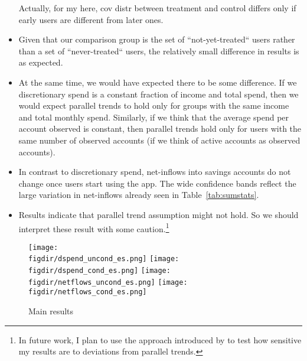 \begin{itemize}
        Actually, for my here, cov distr between treatment and control differs
        only if early users are different from later ones.

    \item  Given that our comparison group is the set of
        ``not-yet-treated`` users rather than a set of ``never-treated`` users,
        the relatively small difference in results is as expected.

    \item At the same time, we would have expected there to be some difference.
        If we discretionary spend is a constant fraction of income and total
        spend, then we would expect parallel trends to hold only for groups
        with the same income and total monthly spend. Similarly, if we think
        that the average spend per account observed is constant, then parallel
        trends hold only for users with the same number of observed accounts
        (if we think of active accounts as observed accounts).

    \item In contrast to discretionary spend, net-inflows into savings accounts
        do not change once users start using the app. The wide confidence
        bands reflect the large variation in net-inflows already seen in
        Table~\ref{tab:sumstats}.

    \item Results indicate that parallel trend assumption might not hold. So we
        should interpret these result with some
        caution.\footnote{In future work, I plan to use the approach introduced
            by \citet{rambachan2022more} to test how sensitive my results are
        to deviations from parallel trends.}


\end{itemize}


\begin{figure}[H]
    \centering 
    \caption{Main results}
    \label{fig:main_results}
    \texttt{[image: \\figdir/dspend\_uncond\_es.png]}
    \texttt{[image: \\figdir/dspend\_cond\_es.png]}
    \texttt{[image: \\figdir/netflows\_uncond\_es.png]}
    \texttt{[image: \\figdir/netflows\_cond\_es.png]}
\end{figure}



